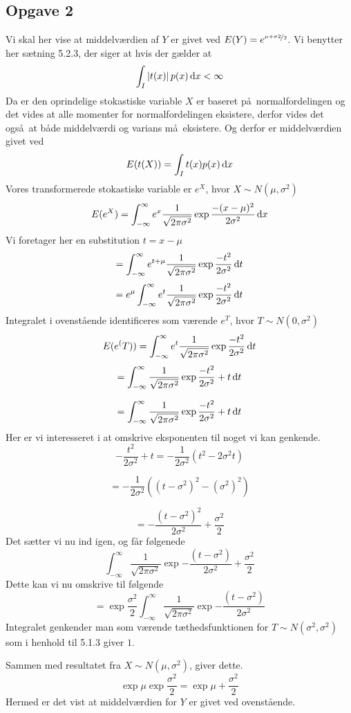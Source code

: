 \subsection*{Opgave 2}
Vi skal her vise at middelv\ae rdien af $Y$ er givet ved $E(Y) = e^{\nicefrac{\mu+\sigma2}{2}}$. Vi benytter her s\ae tning 5.2.3, der siger at hvis der g\ae lder at
\[
\int_{I} \left|t(x)\right|p(x) \, \mathrm{d} x < \infty
\]
Da er den oprindelige stokastiske variable $X$ er baseret p\aa\ normalfordelingen og det vides at alle momenter for normalfordelingen eksistere, derfor vides det ogs\aa\ at b\aa de middelv\ae rdi og varians m\aa\ eksistere. Og derfor er middelv\ae rdien givet ved
\[
E(t(X)) = \int_{I} t(x)p(x) \, \mathrm{d} x
\]
Vores transformerede stokastiske variable er $e^{X}$, hvor $X \sim N(\mu, \sigma^{2})$
\[
E(e^{X}) = \int_{-\infty}^{\infty} e^{x} \frac{1}{\sqrt{2\pi\sigma^{2}}} \exp{\frac{-(x - \mu)^{2}}{2\sigma^{2}}} \, \mathrm{d} x
\]
Vi foretager her en substitution $t = x - \mu$
\[
= \int_{-\infty}^{\infty} e^{t+\mu} \frac{1}{\sqrt{2\pi\sigma^{2}}} \exp{\frac{-t^{2}}{2\sigma^{2}}} \, \mathrm{d} t
\]
\[
= e^{\mu} \int_{-\infty}^{\infty} e^{t} \frac{1}{\sqrt{2\pi\sigma^{2}}} \exp{\frac{-t^{2}}{2\sigma^{2}}} \, \mathrm{d} t
\]
Integralet i ovenst\aa ende identificeres som v\ae rende $e^{T}$, hvor $T \sim N(0, \sigma^{2})$
\[
E(e^(T)) = \int_{-\infty}^{\infty} e^{t} \frac{1}{\sqrt{2\pi\sigma^{2}}} \exp{\frac{-t^{2}}{2\sigma^{2}}} \, \mathrm{d} t
\]
\[
= \int_{-\infty}^{\infty} \frac{1}{\sqrt{2\pi\sigma^{2}}} \exp{\frac{-t^{2}}{2\sigma^{2}}+t} \, \mathrm{d} t
\]

\[
= \int_{-\infty}^{\infty} \frac{1}{\sqrt{2\pi\sigma^{2}}} \exp{\frac{-t^{2}}{2\sigma^{2}}+t} \, \mathrm{d} t
\]
Her er vi interesseret i at omskrive eksponenten til noget vi kan genkende.
\[
- \frac{t^2}{2\sigma^2}+t = - \frac{1}{2\sigma^2}\left( t^2-2\sigma^2t \right)
\]

\[
= - \frac{1}{2\sigma^2}\left( \left( t - \sigma^2 \right)^2 - \left(\sigma^2 \right)^2 \right)
\]

\[
= - \frac{\left( t-\sigma^2 \right)^2}{2\sigma^2} + \frac{\sigma^2}{2}
\] 
Det s\ae tter vi nu ind igen, og f\aa r f\o lgenede
\[
\int_{-\infty}^{\infty} \frac{1}{\sqrt{2\pi\sigma^{2}}} \exp{-\frac{(t-\sigma^2)}{2\sigma^2}+\frac{\sigma^2}{2}}
\]
Dette kan vi nu omskrive til f\o lgende
\[
= \exp{\frac{\sigma^2}{2}} \int_{-\infty}^{\infty} \frac{1}{\sqrt{2\pi\sigma^{2}}} \exp{-\frac{(t-\sigma^2)}{2\sigma^2}}
\]
Integralet genkender man som v\ae rende t\ae thedsfunktionen for $T \sim N(\sigma^2,\sigma^2)$ som i henhold til 5.1.3 giver $1$.

Sammen med resultatet fra $X \sim N(\mu, \sigma^2)$, giver dette.
\[
\exp{\mu} \exp{\frac{\sigma^2}{2}} = \exp{\mu + \frac{\sigma^2}{2}}
\]
Hermed er det vist at middelv\ae rdien for $Y$ er givet ved ovenst\aa ende.


